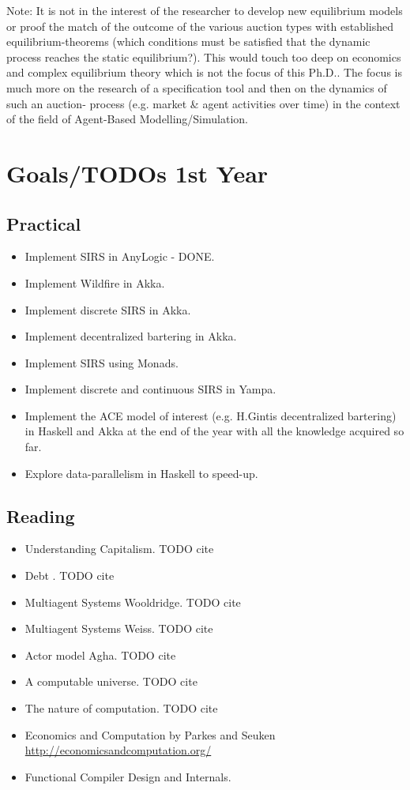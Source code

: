 \documentclass{article}
\begin{document}
{\tiny Note: It is not in the interest of the researcher to develop new equilibrium models or proof the match of the outcome of the various auction types with established equilibrium-theorems (which conditions must be satisfied that the dynamic process reaches the static equilibrium?). This would touch too deep on economics and complex equilibrium theory which is not the focus of this Ph.D.. The focus is much more on the research of a specification tool and then on the dynamics of such an auction- process (e.g. market \& agent activities over time) in the context of the field of Agent-Based Modelling/Simulation.}

\pagebreak

\section{Goals/TODOs 1st Year}
\subsection{Practical}
\begin{itemize}
\item Implement SIRS in AnyLogic - DONE.
\item Implement Wildfire in Akka.
\item Implement discrete SIRS in Akka.
\item Implement decentralized bartering in Akka.
\item Implement SIRS using Monads.
\item Implement discrete and continuous SIRS in Yampa.
\item Implement the ACE model of interest (e.g. H.Gintis decentralized bartering) in Haskell and Akka at the end of the year with all the knowledge acquired so far.
\item Explore data-parallelism in Haskell to speed-up.
\end{itemize}

\subsection{Reading}
\begin{itemize}
\item Understanding Capitalism. TODO cite
\item Debt . TODO cite
\item Multiagent Systems Wooldridge. TODO cite
\item Multiagent Systems Weiss. TODO cite
\item Actor model Agha. TODO cite
\item A computable universe. TODO cite
\item The nature of computation. TODO cite
\item Economics and Computation by Parkes and Seuken \url{http://economicsandcomputation.org/}
\item Functional Compiler Design and Internals.
\end{itemize}
\end{document}
